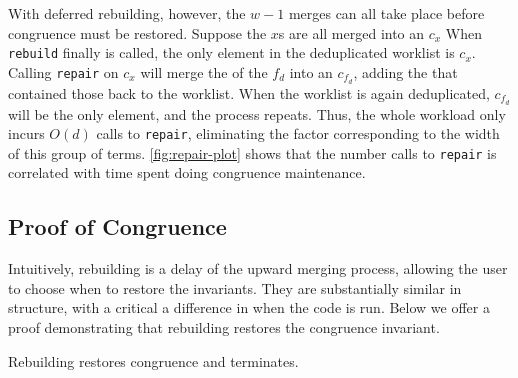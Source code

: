 With deferred rebuilding, however, the $w-1$ merges can all take place before
  congruence must be restored.
Suppose the $x$s are all merged into an \eclass $c_{x}$
When \texttt{rebuild} finally is called,
  the only element in the deduplicated worklist is $c_{x}$.
Calling \texttt{repair} on $c_{x}$ will merge the \eclasses of the $f_{d}$
  \enodes into an \eclass $c_{f_{d}}$,
  adding the \eclasses that contained those \enodes back to the worklist.
When the worklist is again deduplicated,
  $c_{f_{d}}$ will be the only element,
  and the process repeats.
Thus, the whole workload only incurs $O(d)$ calls to \texttt{repair},
  eliminating the factor corresponding to the width of this group of terms.
\autoref{fig:repair-plot} shows that the number calls to \texttt{repair} is
  correlated with time spent doing congruence maintenance.

\subsection{Proof of Congruence}

Intuitively, rebuilding is a delay of the upward merging process, allowing
  the user to choose when to restore the \egraph invariants.
They are substantially similar in structure, with a critical a difference in when
  the code is run.
Below we offer a proof demonstrating that rebuilding restores the
\egraph congruence invariant.

\begin{theorem}
  Rebuilding restores congruence and terminates.
\end{theorem}

